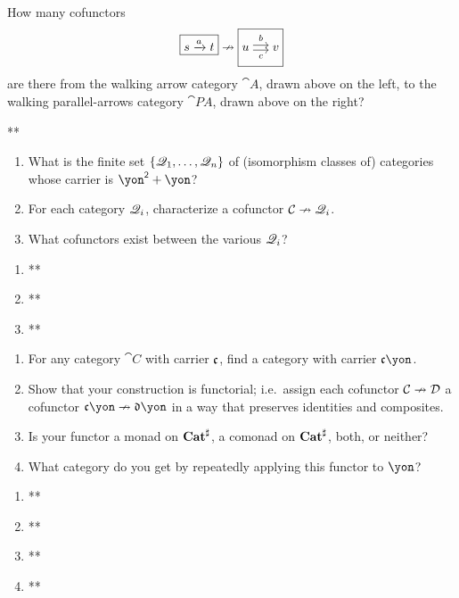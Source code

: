 \documentclass[Book-Poly]{subfiles}
\begin{document}
\begin{exercise} %
How many cofunctors
\[
    \fbox{$s\To{a}t$}\cof\fbox{$u\Tto{b}{c}v$}
\]
are there from the walking arrow category $\cat{A}$, drawn above on the left, to the walking parallel-arrows category $\cat{P\!A}$, drawn above on the right?
\begin{solution}
**
\end{solution}
\end{exercise}

\begin{exercise}
\begin{enumerate}
	\item What is the finite set $\{\mathscr{Q}_1,\ldots,\mathscr{Q}_n\}$ of (isomorphism classes of) categories whose carrier is $\yon^\2+\yon$? %
	\item For each category $\mathscr{Q}_i$, characterize a cofunctor $\mathcal{C}\nrightarrow\mathscr{Q}_i$.
	\item What cofunctors exist between the various $\mathscr{Q}_i$?
\qedhere
\end{enumerate}
\begin{solution}
\begin{enumerate}
    \item **
    \item **
    \item **
\end{enumerate}
\end{solution}
\end{exercise}


\begin{exercise}
\begin{enumerate}
	\item For any category $\cat{C}$ with carrier $\mathfrak{c}$, find a category with carrier $\ema{c}\yon$.
	\item Show that your construction is functorial; i.e.\ assign each cofunctor $\mathcal{C}\nrightarrow\mathcal{D}$ a cofunctor $\ema{c}\yon\cof\ema{d}\yon$ in a way that preserves identities and composites.
	\item Is your functor a monad on $\mathbf{Cat}^\sharp$, a comonad on $\mathbf{Cat}^\sharp$, both, or neither?
	\item What category do you get by repeatedly applying this functor to $\yon$?
\qedhere
\end{enumerate}
\begin{solution}
\begin{enumerate}
    \item **
    \item **
    \item **
    \item **
\end{enumerate}
\end{solution}
\end{exercise}
\end{document}
